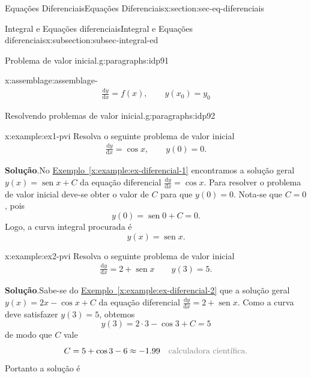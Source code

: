 \documentclass[oneside,10pt,]{article}
\newcommand{\blocktitlefont}{\relax}
\newcommand{\xreffont}{\relax}
\numberwithin{equation}{section}
\newcommand{\dd}{\mathrm{d}}
\DeclareMathOperator{\sin}{sen}
\begin{document}
\begin{sectionptx}{Equações Diferenciais}{}{Equações Diferenciais}{}{}{x:section:sec-eq-diferenciais}
\begin{subsectionptx}{Integral e Equações diferenciais}{}{Integral e Equações diferenciais}{}{}{x:subsection:subsec-integral-ed}
\begin{paragraphs}{Problema de valor inicial.}{g:paragraphs:idp91}
\begin{assemblage}{}{x:assemblage:assemblage-}
%
\begin{gather}
\frac{\dd y}{\dd x}=f(x), \qquad y(x_0)=y_0\label{x:mrow:eq-pvi}
\end{gather}
%
\end{assemblage}
%
\end{paragraphs}%
\begin{paragraphs}{Resolvendo problemas de valor inicial.}{g:paragraphs:idp92}%
\begin{example}{}{x:example:ex1-pvi}%
Resolva o seguinte problema de valor inicial%
\begin{gather*}
\frac{\dd y}{\dd x}=\cos{x}, \qquad y(0)=0 \text{.}
\end{gather*}
%
\par\smallskip%
\noindent\textbf{\blocktitlefont Solução}.\hypertarget{g:solution:idp93}{}\quad{}No \hyperref[x:example:ex-diferencial-1]{Exemplo~{\xreffont\ref{x:example:ex-diferencial-1}}} encontramos a solução geral \(y(x)=\sin{x}+C\) da equação diferencial \(\frac{\dd y}{\dd x}=\cos{x}\). Para resolver o problema de valor inicial deve-se obter o valor de \(C\) para que \(y(0)=0\). Nota-se que \(C=0\), pois%
\begin{equation*}
y(0)=\sin{0} + C=0\text{.}
\end{equation*}
Logo, a curva integral procurada é%
\begin{equation*}
y(x)=\sin{x}\text{.}
\end{equation*}
%
\end{example}
\begin{example}{}{x:example:ex2-pvi}%
Resolva o seguinte problema de valor inicial%
\begin{gather*}
\frac{\dd y}{\dd x}= 2+ \sin{x} \qquad y(3)=5 \text{.}
\end{gather*}
%
\par\smallskip%
\noindent\textbf{\blocktitlefont Solução}.\hypertarget{g:solution:idp94}{}\quad{}Sabe-se do \hyperref[x:example:ex-diferencial-2]{Exemplo~{\xreffont\ref{x:example:ex-diferencial-2}}} que a solução geral \(y(x)=2x - \cos{x} +C\) da equação diferencial \(\frac{\dd y}{\dd x}= 2+ \sin{x}\). Como a curva deve satisfazer \(y(3)=5\), obtemos%
\begin{equation*}
y(3)=2\cdot 3-\cos{3} + C=5
\end{equation*}
de modo que \(C\) vale%
\begin{equation*}
C = 5+\cos{3}-6 \approx -1.99 \quad \color{gray}{\text{calculadora científica}}\text{.}
\end{equation*}
Portanto a solução é%

\end{example}
\end{paragraphs}
\end{subsectionptx}
\end{sectionptx}
\end{document}
